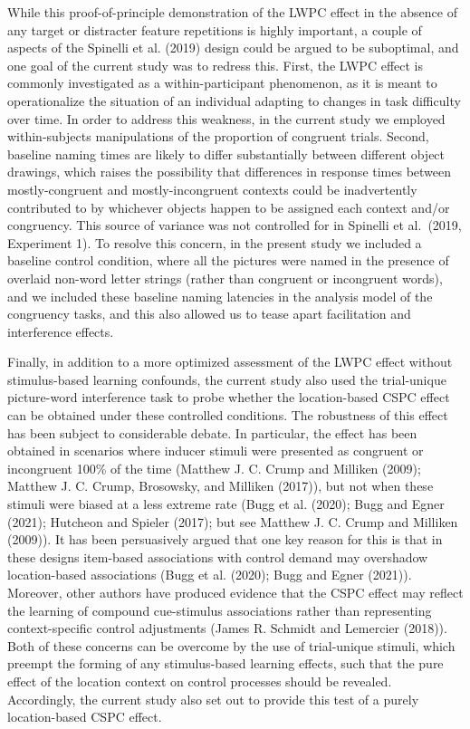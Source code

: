 \documentclass[
  ,man,floatsintext]{apa6}
\begin{document}
While this proof-of-principle demonstration of the LWPC effect in the absence of any target or distracter feature repetitions is highly important, a couple of aspects of the Spinelli et al. (2019) design could be argued to be suboptimal, and one goal of the current study was to redress this. First, the LWPC effect is commonly investigated as a within-participant phenomenon, as it is meant to operationalize the situation of an individual adapting to changes in task difficulty over time. In order to address this weakness, in the current study we employed within-subjects manipulations of the proportion of congruent trials. Second, baseline naming times are likely to differ substantially between different object drawings, which raises the possibility that differences in response times between mostly-congruent and mostly-incongruent contexts could be inadvertently contributed to by whichever objects happen to be assigned each context and/or congruency. This source of variance was not controlled for in Spinelli et al.~(2019, Experiment 1). To resolve this concern, in the present study we included a baseline control condition, where all the pictures were named in the presence of overlaid non-word letter strings (rather than congruent or incongruent words), and we included these baseline naming latencies in the analysis model of the congruency tasks, and this also allowed us to tease apart facilitation and interference effects.

Finally, in addition to a more optimized assessment of the LWPC effect without stimulus-based learning confounds, the current study also used the trial-unique picture-word interference task to probe whether the location-based CSPC effect can be obtained under these controlled conditions. The robustness of this effect has been subject to considerable debate. In particular, the effect has been obtained in scenarios where inducer stimuli were presented as congruent or incongruent 100\% of the time (Matthew J. C. Crump and Milliken (2009); Matthew J. C. Crump, Brosowsky, and Milliken (2017)), but not when these stimuli were biased at a less extreme rate (Bugg et al. (2020); Bugg and Egner (2021); Hutcheon and Spieler (2017); but see Matthew J. C. Crump and Milliken (2009)). It has been persuasively argued that one key reason for this is that in these designs item-based associations with control demand may overshadow location-based associations (Bugg et al. (2020); Bugg and Egner (2021)). Moreover, other authors have produced evidence that the CSPC effect may reflect the learning of compound cue-stimulus associations rather than representing context-specific control adjustments (James R. Schmidt and Lemercier (2018)). Both of these concerns can be overcome by the use of trial-unique stimuli, which preempt the forming of any stimulus-based learning effects, such that the pure effect of the location context on control processes should be revealed. Accordingly, the current study also set out to provide this test of a purely location-based CSPC effect.
\end{document}
